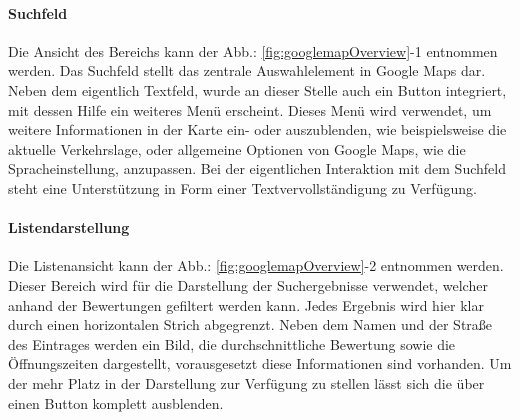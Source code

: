 \documentclass[../Bachelorarbeit.tex]{subfiles}
\begin{document}
\paragraph{Suchfeld}
\label{gmapsSearch}
Die Ansicht des Bereichs  kann der Abb.: \ref{fig:googlemapOverview}-1 entnommen werden.
Das Suchfeld stellt das zentrale Auswahlelement in Google Maps dar. 
Neben dem eigentlich Textfeld, wurde an dieser Stelle auch ein Button integriert, mit dessen Hilfe ein weiteres Menü erscheint. 
Dieses Menü wird verwendet, um weitere Informationen  in der Karte ein- oder auszublenden, wie beispielsweise die aktuelle Verkehrslage, oder allgemeine Optionen von Google Maps, wie die Spracheinstellung, anzupassen.
Bei der eigentlichen Interaktion mit dem Suchfeld steht eine Unterstützung in Form einer Textvervollständigung zu Verfügung. 

\paragraph{Listendarstellung}
\label{gmapsList}
Die Listenansicht kann der Abb.: \ref{fig:googlemapOverview}-2 entnommen werden.
Dieser Bereich wird für die Darstellung der Suchergebnisse verwendet, welcher anhand der Bewertungen gefiltert werden kann.
Jedes Ergebnis wird hier klar durch einen horizontalen Strich abgegrenzt.
Neben dem Namen und der Straße des Eintrages werden ein Bild, die durchschnittliche Bewertung sowie die Öffnungszeiten dargestellt, vorausgesetzt diese Informationen sind vorhanden.
Um der  mehr Platz in der Darstellung zur Verfügung zu stellen lässt sich die  über einen Button komplett ausblenden. 
\end{document}
